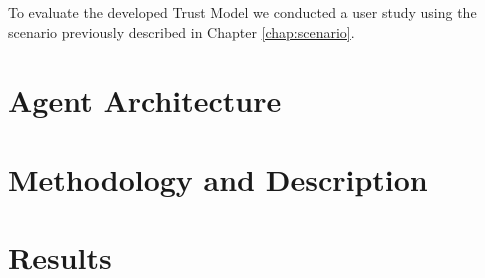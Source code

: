 \label{chap:UserStudies}
To evaluate the developed Trust Model we conducted a user study using the scenario previously described in Chapter \ref{chap:scenario}. 

\section{Agent Architecture}

\section{Methodology and Description}

\section{Results}